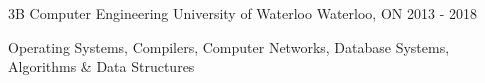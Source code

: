 

\begin{cventries}

  \cventry
    {3B Computer Engineering} %
    {University of Waterloo} %
    {Waterloo, ON} %
    {2013 - 2018} %
    {
      \begin{cvitems} %
      \item {Operating Systems, Compilers, Computer Networks, Database Systems, Algorithms \& Data Structures}
      \end{cvitems}
    }

\end{cventries}
